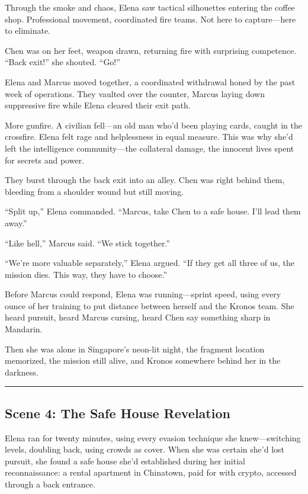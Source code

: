 \documentclass[12pt,letterpaper]{book}
\begin{document}
Through the smoke and chaos, Elena saw tactical silhouettes entering the coffee shop. Professional movement, coordinated fire teams. Not here to capture---here to eliminate.

Chen was on her feet, weapon drawn, returning fire with surprising competence. ``Back exit!'' she shouted. ``Go!''

Elena and Marcus moved together, a coordinated withdrawal honed by the past week of operations. They vaulted over the counter, Marcus laying down suppressive fire while Elena cleared their exit path.

More gunfire. A civilian fell---an old man who'd been playing cards, caught in the crossfire. Elena felt rage and helplessness in equal measure. This was why she'd left the intelligence community---the collateral damage, the innocent lives spent for secrets and power.

They burst through the back exit into an alley. Chen was right behind them, bleeding from a shoulder wound but still moving.

``Split up,'' Elena commanded. ``Marcus, take Chen to a safe house. I'll lead them away.''

``Like hell,'' Marcus said. ``We stick together.''

``We're more valuable separately,'' Elena argued. ``If they get all three of us, the mission dies. This way, they have to choose.''

Before Marcus could respond, Elena was running---sprint speed, using every ounce of her training to put distance between herself and the Kronos team. She heard pursuit, heard Marcus cursing, heard Chen say something sharp in Mandarin.

Then she was alone in Singapore's neon-lit night, the fragment location memorized, the mission still alive, and Kronos somewhere behind her in the darkness.

\begin{center}\rule{0.5\linewidth}{0.5pt}\end{center}

\hypertarget{scene-4-the-safe-house-revelation}{%
\subsection{Scene 4: The Safe House Revelation}\label{scene-4-the-safe-house-revelation}}

Elena ran for twenty minutes, using every evasion technique she knew---switching levels, doubling back, using crowds as cover. When she was certain she'd lost pursuit, she found a safe house she'd established during her initial reconnaissance: a rental apartment in Chinatown, paid for with crypto, accessed through a back entrance.
\end{document}
